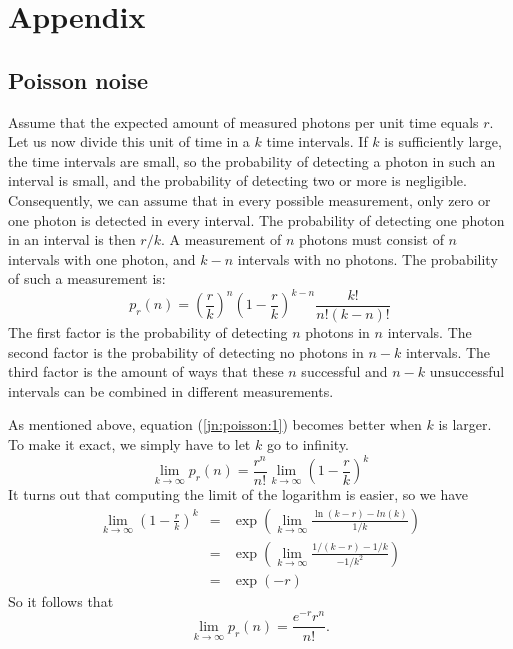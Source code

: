\chapter{Appendix}

\section{Poisson noise}  \label{app:poisson}
Assume that the expected amount of measured photons per unit time equals $r$.
Let us now divide this unit of time in a $k$ time intervals. If $k$ is
sufficiently large, the time intervals are small, so the probability of
detecting a photon in such an interval is small, and the probability of
detecting two or more is negligible. Consequently, we can assume that in every
possible measurement, only zero or one photon is detected in every
interval. The probability of detecting one photon in an interval is then $r /
k$. A measurement of $n$ photons must consist of $n$ intervals with one
photon, and $k - n$ intervals with no photons. The probability of such a
measurement is:
\begin{equation}
p_r(n) = \left( \frac{r}{k} \right)^n \left(1 - \frac{r}{k} \right)^{k-n}
       \frac{k!}{n!(k-n)!}  \label{jn:poisson:1}
\end{equation}
The first factor is the probability of detecting $n$ photons in $n$ intervals.
The second factor is the probability of detecting no photons in $n - k$
intervals.  The third factor is the amount of ways that these $n$ successful
and $n-k$ unsuccessful intervals can be combined in different measurements.

As mentioned above, equation (\ref{jn:poisson:1}) becomes better when $k$ is
larger.  To make it exact, we simply have to let $k$ go to infinity.
\begin{equation}
  \lim_{k \rightarrow \infty} p_r(n) 
  = \frac{r^n}{n!} \lim_{k \rightarrow \infty} \left( 1 - \frac{r}{k} \right)^k
\end{equation}
It turns out that computing the limit of the logarithm is easier, so we have
\begin{align}
  \lim_{k \rightarrow \infty} \left( 1 - \frac{r}{k} \right)^k
 & = &
 \exp \left(\lim_{k \rightarrow \infty} \frac{\ln(k - r) - ln(k)}{1/k}  \right)
\nonumber\\
& = & 
  \exp \left(\lim_{k \rightarrow \infty}  
  \frac{1/ (k-r) - 1/k}{-1/k^2} \right) \nonumber \\
& = & \exp (-r)
\end{align}
So it follows that 
\begin{equation}
  \lim_{k \rightarrow \infty} p_r(n) = \frac{e^{-r} r^n}{n!}. 
\end{equation}

